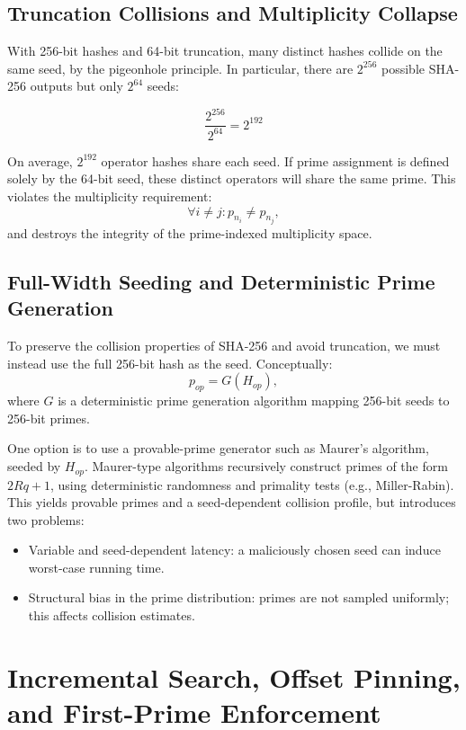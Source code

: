 \documentclass[11pt]{article}
\begin{document}
\subsection{Truncation Collisions and Multiplicity Collapse}

With 256-bit hashes and 64-bit truncation, many distinct hashes collide on the same seed, by the pigeonhole principle. In particular, there are \(2^{256}\) possible SHA-256 outputs but only \(2^{64}\) seeds:

\[
  \frac{2^{256}}{2^{64}} = 2^{192}
\]

On average, \(2^{192}\) operator hashes share each seed. If prime assignment is defined solely by the 64-bit seed, these distinct operators will share the same prime. This violates the multiplicity requirement:
\[
  \forall i \neq j: p_{n_i} \neq p_{n_j},
\]
and destroys the integrity of the prime-indexed multiplicity space.

\subsection{Full-Width Seeding and Deterministic Prime Generation}

To preserve the collision properties of SHA-256 and avoid truncation, we must instead use the full 256-bit hash as the seed. Conceptually:
\[
  p_{op} = G(H_{op}),
\]
where \( G \) is a deterministic prime generation algorithm mapping 256-bit seeds to 256-bit primes.

One option is to use a provable-prime generator such as Maurer's algorithm, seeded by \( H_{op} \). Maurer-type algorithms recursively construct primes of the form \( 2Rq + 1 \), using deterministic randomness and primality tests (e.g., Miller-Rabin). This yields provable primes and a seed-dependent collision profile, but introduces two problems:
\begin{itemize}[leftmargin=*]
  \item Variable and seed-dependent latency: a maliciously chosen seed can induce worst-case running time.
  \item Structural bias in the prime distribution: primes are not sampled uniformly; this affects collision estimates.
\end{itemize}

\section{Incremental Search, Offset Pinning, and First-Prime Enforcement}
\end{document}
